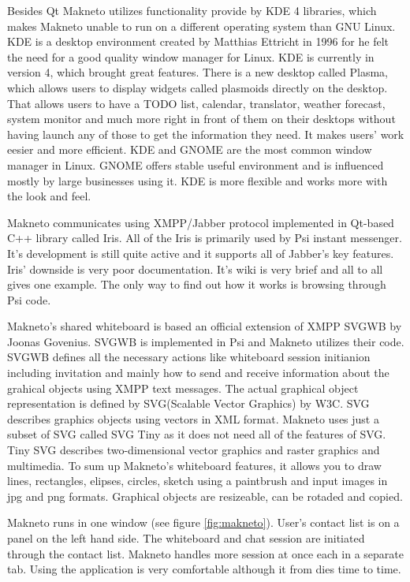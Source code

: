 Besides Qt Makneto utilizes functionality provide by KDE 4\cite{KDE} libraries, which makes Makneto unable to run on a different operating system than GNU Linux. KDE is a desktop environment created by Matthias Ettricht in 1996 for he felt the need for a good quality window manager for Linux. KDE is currently in version 4, which brought great features. There is a new desktop called Plasma, which allows users to display widgets called plasmoids directly on the desktop. That allows users to have a TODO list, calendar, translator, weather forecast, system monitor and much more right in front of them on their desktops without having launch any of those to get the information they need. It makes users' work eesier and more efficient. KDE and GNOME are the most common window manager in Linux. GNOME offers stable useful environment and is influenced mostly by large businesses using it. KDE is more flexible and works more with the look and feel.

Makneto communicates using XMPP/Jabber protocol implemented in Qt-based C++ library called Iris. All of the Iris is primarily used by Psi instant messenger. It's development is still quite active and it supports all of Jabber's key features. Iris' downside is very poor documentation. It's wiki is very brief and all to all gives one example. The only way to find out how it works is browsing through Psi code.\cite{irisWiki}

Makneto's shared whiteboard is based an official extension of XMPP SVGWB by Joonas Govenius\cite{SVGWB}. SVGWB is implemented in Psi and Makneto utilizes their code. SVGWB defines all the necessary actions like whiteboard session initianion including invitation and mainly how to send and receive information about the grahical objects using XMPP text messages. The actual graphical object representation is defined by SVG\cite{SVG}(Scalable Vector Graphics) by W3C. SVG describes graphics objects using vectors in XML format. Makneto uses just a subset of SVG called SVG Tiny\cite{SVGtiny} as it does not need all of the features of SVG. Tiny SVG describes two-dimensional vector graphics and raster graphics and multimedia. To sum up Makneto's whiteboard features, it allows you to draw lines, rectangles, elipses, circles, sketch using a paintbrush and input images in jpg and png formats. Graphical objects are resizeable, can be rotaded and copied.  

Makneto runs in one window (see figure \ref{fig:makneto}). User's contact list is on a panel on the left hand side. The whiteboard and chat session are initiated through the contact list. Makneto handles more session at once each in a separate tab. Using the application is very comfortable although it from dies time to time.


